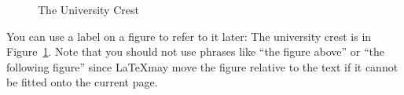 \documentclass{article}
\begin{document}
\begin{figure}

\begin{center}
\end{center}

\caption{The University Crest}
\label{fig:eucrest}

\end{figure}





You can use a label on a figure to refer to it later: The university
crest is in Figure~\ref{fig:eucrest}. Note that you should not use phrases like
``the figure above'' or ``the following figure'' since \LaTeX  may move
the figure relative to the text if it cannot be fitted onto the current page.
\end{document}
